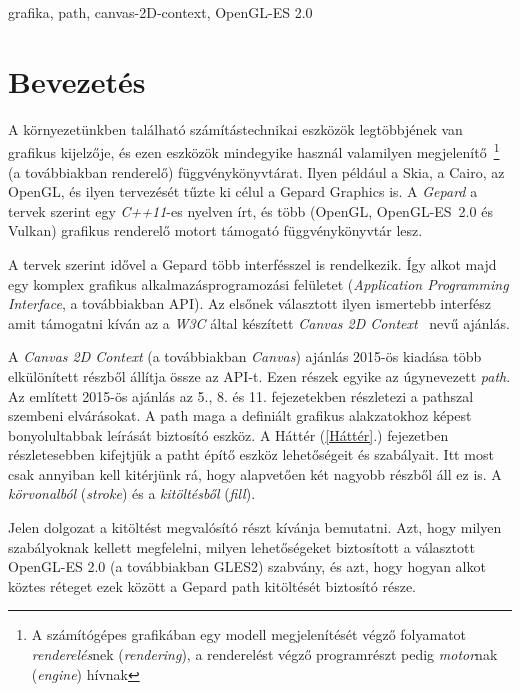 \documentclass[12pt]{report}
\theoremstyle{definition}
\newcommand{\inenglish}[1]{\textsl{#1}}
\newcommand{\inenglishfn}[1]{\footnotesize{\inenglish{#1}}}
\begin{document}
grafika, path, canvas-2D-context, OpenGL-ES 2.0



    \chapter*{Bevezetés}
    \label{Bevezetés}

  A környezetünkben található számítástechnikai eszközök
legtöbbjének van grafikus kijelzője, és ezen eszközök mindegyike
használ valamilyen megjelenítő~\footnote{A számítógépes grafikában egy
modell megjelenítését végző folyamatot \emph{renderelés}nek
(\inenglishfn{rendering}), a renderelést végző programrészt pedig
\emph{motor}nak (\inenglishfn{engine}) hívnak} (a továbbiakban
renderelő) függvénykönyvtárat. Ilyen például a Skia, a Cairo, az
OpenGL, és ilyen tervezését tűzte ki célul a Gepard Graphics is. A
\emph{Gepard} a tervek szerint egy \emph{C++11}-es nyelven írt, és több
(OpenGL, \mbox{OpenGL-ES 2.0\cite{Munshi:2008:OEP:1481069}} és Vulkan)
grafikus renderelő motort támogató függvénykönyvtár lesz.

  A tervek szerint idővel a Gepard több interfésszel is rendelkezik.
Így alkot majd egy komplex grafikus alkalmazásprogramozási felületet
(\inenglish{Application Programming Interface}, a továbbiakban API). Az
elsőnek választott ilyen ismertebb interfész amit támogatni kíván az a
\emph{W3C} által készített \emph{Canvas 2D
Context}~\cite{Cabanier:14:HCC} nevű ajánlás.

  A \emph{Canvas 2D Context} (a továbbiakban \emph{Canvas}) ajánlás
2015-ös kiadása több elkülönített részből állítja össze az API-t. Ezen
részek egyike az úgynevezett \emph{path}. Az említett 2015-ös ajánlás
az 5., 8. és 11. fejezetekben részletezi a pathszal szembeni
elvárásokat. A path maga a definiált grafikus alakzatokhoz képest
bonyolultabbak leírását biztosító eszköz. A Háttér (\ref{Háttér}.)
fejezetben részletesebben kifejtjük a patht építő eszköz lehetőségeit
és szabályait. Itt most csak annyiban kell kitérjünk rá, hogy
alapvetően két nagyobb részből áll ez is. A \emph{körvonalból}
(\inenglish{stroke}) és a \emph{kitöltésből} (\inenglish{fill}).

  Jelen dolgozat a kitöltést megvalósító részt kívánja bemutatni.
Azt, hogy milyen szabályoknak kellett megfelelni, milyen lehetőségeket
biztosított a választott OpenGL-ES 2.0 (a továbbiakban GLES2) szabvány,
és azt, hogy hogyan alkot köztes réteget ezek között a Gepard path
kitöltését biztosító része.
\end{document}
